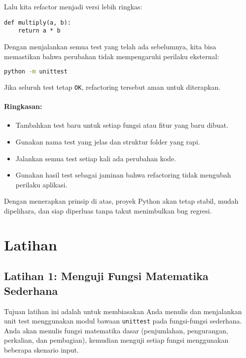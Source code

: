 Lalu kita refactor menjadi versi lebih ringkas:

\begin{lstlisting}[style=PythonStyle]
def multiply(a, b):
    return a * b
\end{lstlisting}

Dengan menjalankan semua test yang telah ada sebelumnya, kita bisa memastikan bahwa perubahan tidak mempengaruhi perilaku eksternal:

\begin{lstlisting}[language=bash]
python -m unittest
\end{lstlisting}

Jika seluruh test tetap \texttt{OK}, refactoring tersebut aman untuk diterapkan.

\paragraph{Ringkasan:}
\begin{itemize}
    \item Tambahkan test baru untuk setiap fungsi atau fitur yang baru dibuat.
    \item Gunakan nama test yang jelas dan struktur folder yang rapi.
    \item Jalankan semua test setiap kali ada perubahan kode.
    \item Gunakan hasil test sebagai jaminan bahwa refactoring tidak mengubah perilaku aplikasi.
\end{itemize}

Dengan menerapkan prinsip di atas, proyek Python akan tetap stabil, mudah dipelihara, dan siap diperluas tanpa takut menimbulkan bug regresi.



\section*{Latihan}
\subsection*{Latihan 1: Menguji Fungsi Matematika Sederhana}

Tujuan latihan ini adalah untuk membiasakan Anda menulis dan menjalankan unit test menggunakan modul bawaan \texttt{unittest} pada fungsi-fungsi sederhana.  
Anda akan menulis fungsi matematika dasar (penjumlahan, pengurangan, perkalian, dan pembagian), kemudian menguji setiap fungsi menggunakan beberapa skenario input.

